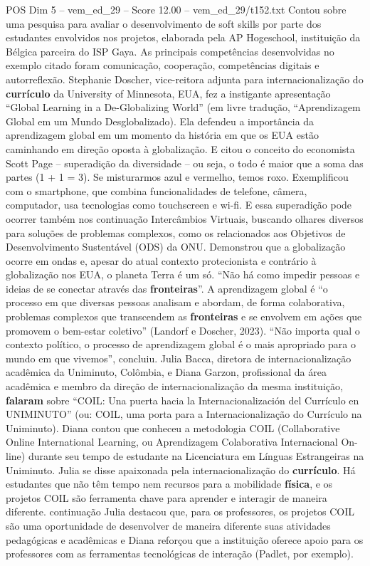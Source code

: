 \begin{textsample}{POS Dim 5 – vem\_ed\_29 – Score 12.00 – vem\_ed\_29/t152.txt}
Contou sobre uma pesquisa para avaliar o desenvolvimento de soft skills por parte dos estudantes envolvidos nos projetos, elaborada pela AP Hogeschool, instituição da Bélgica parceira do ISP Gaya.
As principais competências desenvolvidas no exemplo citado foram comunicação, cooperação, competências digitais e autorreflexão.
Stephanie Doscher, vice-reitora adjunta para internacionalização do \textbf{currículo} da University of Minnesota, EUA, fez a instigante apresentação “Global Learning in a De-Globalizing World” (em livre tradução, “Aprendizagem Global em um Mundo Desglobalizado).
Ela defendeu a importância da aprendizagem global em um momento da história em que os EUA estão caminhando em direção oposta à globalização.
E citou o conceito do economista Scott Page – superadição da diversidade – ou seja, o todo é maior que a soma das partes (1 + 1 = 3).
Se misturarmos azul e vermelho, temos roxo.
Exemplificou com o smartphone, que combina funcionalidades de telefone, câmera, computador, usa tecnologias como touchscreen e wi-fi.
E essa superadição pode ocorrer também nos continuação Intercâmbios Virtuais, buscando olhares diversos para soluções de problemas complexos, como os relacionados aos Objetivos de Desenvolvimento Sustentável (ODS) da ONU.
Demonstrou que a globalização ocorre em ondas e, apesar do atual contexto protecionista e contrário à globalização nos EUA, o planeta Terra é um só. “Não há como impedir pessoas e ideias de se conectar através das \textbf{fronteiras}”.
A aprendizagem global é “o processo em que diversas pessoas analisam e abordam, de forma colaborativa, problemas complexos que transcendem as \textbf{fronteiras} e se envolvem em ações que promovem o bem-estar coletivo” (Landorf e Doscher, 2023). “Não importa qual o contexto político, o processo de aprendizagem global é o mais apropriado para o mundo em que vivemos”, concluiu.
Julia Bacca, diretora de internacionalização acadêmica da Uniminuto, Colômbia, e Diana Garzon, profissional da área acadêmica e membro da direção de internacionalização da mesma instituição, \textbf{falaram} sobre “COIL: Una puerta hacia la Internacionalización del Currículo en UNIMINUTO” (ou: COIL, uma porta para a Internacionalização do Currículo na Uniminuto).
Diana contou que conheceu a metodologia COIL (Collaborative Online International Learning, ou Aprendizagem Colaborativa Internacional On-line) durante seu tempo de estudante na Licenciatura em Línguas Estrangeiras na Uniminuto.
Julia se disse apaixonada pela internacionalização do \textbf{currículo}.
Há estudantes que não têm tempo nem recursos para a mobilidade \textbf{física}, e os projetos COIL são ferramenta chave para aprender e interagir de maneira diferente. continuação Julia destacou que, para os professores, os projetos COIL são uma oportunidade de desenvolver de maneira diferente suas atividades pedagógicas e acadêmicas e Diana reforçou que a instituição oferece apoio para os professores com as ferramentas tecnológicas de interação (Padlet, por exemplo).

\end{textsample}

